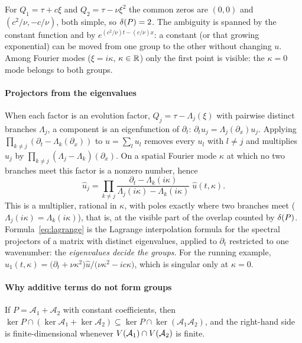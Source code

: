 \begin{example}\label{ex:tpd-factor}
For $Q_1=\tau+c\xi$ and $Q_2=\tau-\nu\xi^2$ the common zeros are $(0,0)$ and $(c^2/\nu,-c/\nu)$,
both simple, so $\delta(P)=2$. The ambiguity is spanned by the constant function and by
$e^{(c^2/\nu)t-(c/\nu)x}$: a constant (or that growing exponential) can be moved from one group to
the other without changing $u$. Among Fourier modes ($\xi=i\kappa$, $\kappa\in\mathbb{R}$) only the
first point is visible: the $\kappa=0$ mode belongs to both groups.
\end{example}

\paragraph{Projectors from the eigenvalues}
When each factor is an evolution factor, $Q_j=\tau-\Lambda_j(\xi)$ with pairwise distinct branches
$\Lambda_j$, a component is an eigenfunction of $\partial_t$: $\partial_tu_j=\Lambda_j(\partial_x)u_j$. Applying
$\prod_{k\ne j}(\partial_t-\Lambda_k(\partial_x))$ to $u=\sum_lu_l$ removes every $u_l$ with $l\ne j$ and multiplies $u_j$ by $\prod_{k\ne j}(\Lambda_j-\Lambda_k)(\partial_x)$.
On a spatial Fourier mode $\kappa$ at which no two branches meet this factor is a nonzero number, hence
\begin{equation}\label{eq:lagrange}
  \hat u_j=\prod_{k\ne j}\frac{\partial_t-\Lambda_k(i\kappa)}{\Lambda_j(i\kappa)-\Lambda_k(i\kappa)}\;\hat u(t,\kappa) .
\end{equation}
This is a multiplier, rational in $\kappa$, with poles exactly where two branches
meet ($\Lambda_j(i\kappa)=\Lambda_k(i\kappa)$), that is, at the visible part of the overlap counted by $\delta(P)$.
Formula~\eqref{eq:lagrange} is the Lagrange interpolation formula for the spectral projectors of a
matrix with distinct eigenvalues, applied to $\partial_t$ restricted to one wavenumber: the
\emph{eigenvalues decide the groups}. For the running example,
$\hat u_1(t,\kappa)=\big(\partial_t+\nu\kappa^2\big)\hat u/\big(\nu\kappa^2-ic\kappa\big)$, which is
singular only at $\kappa=0$.

\paragraph{Why additive terms do not form groups}
\begin{proposition}\label{prop:terms}
If $P=\mathcal A_1+\mathcal A_2$ with constant coefficients, then
$\ker P\cap(\ker \mathcal A_1+\ker \mathcal A_2)\subseteq\ker P\cap\ker(\mathcal A_1\mathcal A_2)$, and the right-hand side is
finite-dimensional whenever $V(\mathcal A_1)\cap V(\mathcal A_2)$ is finite.
\end{proposition}

